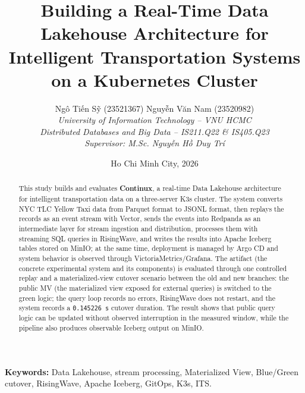 \title{\Large\textbf{Building a Real-Time Data Lakehouse Architecture for Intelligent Transportation Systems on a Kubernetes Cluster}}
\author{
    Ngô Tiến Sỹ (23521367) \quad Nguyễn Văn Nam (23520982) \\[0.5em]
    \fontsize{10pt}{11pt}\selectfont \textit{University of Information Technology -- VNU HCMC} \\
    \fontsize{10pt}{11pt}\selectfont \textit{Distributed Databases and Big Data -- IS211.Q22 \& IS405.Q23} \\
    \fontsize{10pt}{11pt}\selectfont \textit{Supervisor: M.Sc. Nguyễn Hồ Duy Trí}
}
\date{Ho Chi Minh City, 2026}

\maketitle

\begin{abstract}
This study builds and evaluates \textbf{Continux}, a real-time Data Lakehouse architecture for intelligent transportation data on a three-server K3s cluster. The system converts NYC TLC Yellow Taxi data from Parquet format to JSONL format, then replays the records as an event stream with Vector, sends the events into Redpanda as an intermediate layer for stream ingestion and distribution, processes them with streaming SQL queries in RisingWave, and writes the results into Apache Iceberg tables stored on MinIO; at the same time, deployment is managed by Argo CD and system behavior is observed through VictoriaMetrics/Grafana. The artifact (the concrete experimental system and its components) is evaluated through one controlled replay and a materialized-view cutover scenario between the old and new branches: the public MV (the materialized view exposed for external queries) is switched to the green logic; the query loop records no errors, RisingWave does not restart, and the system records a \texttt{0.145226 s} cutover duration. The result shows that public query logic can be updated without observed interruption in the measured window, while the pipeline also produces observable Iceberg output on MinIO.
\end{abstract}

\noindent\textbf{Keywords:} Data Lakehouse, stream processing, Materialized View, Blue/Green cutover, RisingWave, Apache Iceberg, GitOps, K3s, ITS.
